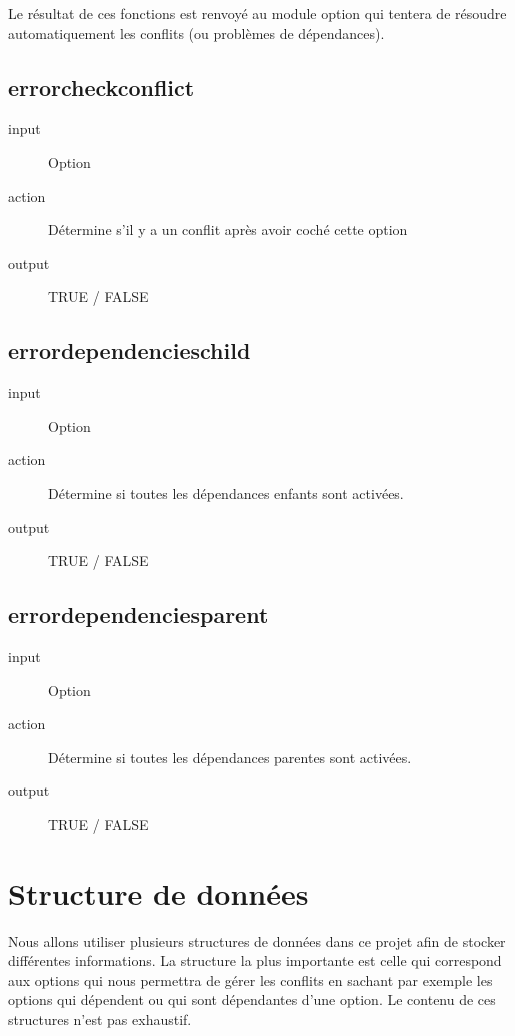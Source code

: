\documentclass[16pts]{report}
\begin{document}
Le résultat de ces fonctions est renvoyé au module option qui tentera de
résoudre automatiquement les conflits (ou problèmes de dépendances).

\section{error\textunderscore check\textunderscore conflict}
\label{sec:error check conflict}
\begin{description}
    \item[input] Option
    \item[action] Détermine s’il y a un conflit après avoir coché cette option
    \item[output] TRUE / FALSE
\end{description}

\section{error\textunderscore dependencies\textunderscore child}
\label{sec:error dependencies child}
\begin{description}
    \item[input] Option
    \item[action] Détermine si toutes les dépendances enfants sont activées.
    \item[output] TRUE / FALSE
\end{description}

\section{error\textunderscore dependencies\textunderscore parent}
\label{sec:error dependencies parent}
\begin{description}
    \item[input] Option
    \item[action] Détermine si toutes les dépendances parentes sont activées.
    \item[output] TRUE / FALSE
\end{description}

\chapter{Structure de données}
\label{cha:Structure de données}


Nous allons utiliser plusieurs structures de données dans ce projet afin de
stocker différentes informations. La structure la plus importante est celle qui
correspond aux options qui nous permettra de gérer les conflits en sachant par
exemple les options qui dépendent ou qui sont dépendantes d’une option. Le
contenu de ces structures n’est pas exhaustif.
\end{document}
